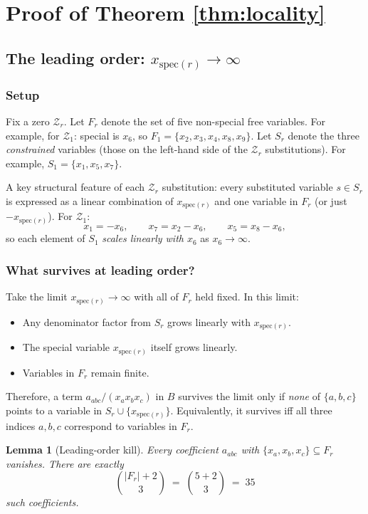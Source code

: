 \documentclass[11pt]{article}
\newcommand{\Z}{\mathcal{Z}}
\newcommand{\spec}{\mathrm{spec}}
\newtheorem{lemma}{Lemma}
\theoremstyle{definition}
\begin{document}
\section{Proof of Theorem \ref{thm:locality}}
\label{sec:proof}

\subsection{The leading order: $x_{\spec(r)}\to\infty$}
\label{sec:order0}

\subsubsection*{Setup}

Fix a zero $\Z_r$. Let $F_r$ denote the set of five non-special free
variables. For example, for $\Z_1$: special is $x_6$, so $F_1=\{x_2,x_3,x_4,x_8,x_9\}$.
Let $S_r$ denote the three \emph{constrained} variables (those on the left-hand
side of the $\Z_r$ substitutions). For example, $S_1=\{x_1,x_5,x_7\}$.

A key structural feature of each $\Z_r$ substitution: every substituted
variable $s\in S_r$ is expressed as a linear combination of $x_{\spec(r)}$
and one variable in $F_r$ (or just $-x_{\spec(r)}$). For $\Z_1$:
\[
x_1=-x_6,\qquad x_7=x_2-x_6,\qquad x_5=x_8-x_6,
\]
so each element of $S_1$ \emph{scales linearly with $x_6$} as $x_6\to\infty$.

\subsubsection*{What survives at leading order?}

Take the limit $x_{\spec(r)}\to\infty$ with all of $F_r$ held fixed. In this
limit:
\begin{itemize}[nosep]
  \item Any denominator factor from $S_r$ grows linearly with $x_{\spec(r)}$.
  \item The special variable $x_{\spec(r)}$ itself grows linearly.
  \item Variables in $F_r$ remain finite.
\end{itemize}
Therefore, a term $a_{abc}/(x_a x_b x_c)$ in $B$ survives the limit only if
\emph{none} of $\{a,b,c\}$ points to a variable in $S_r\cup\{x_{\spec(r)}\}$.
Equivalently, it survives iff all three indices $a,b,c$ correspond to
variables in $F_r$.

\begin{lemma}[Leading-order kill]
\label{lem:order0}
Every coefficient $a_{abc}$ with $\{x_a,x_b,x_c\}\subseteq F_r$ vanishes.
There are exactly
\[
\binom{|F_r|+2}{3}\;=\;\binom{5+2}{3}\;=\;35
\]
such coefficients.
\end{lemma}
\end{document}
